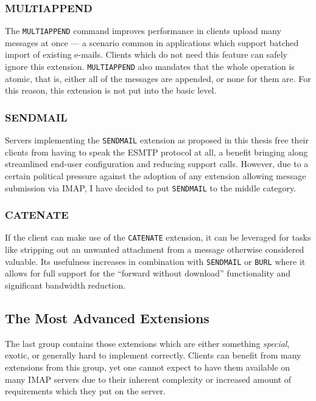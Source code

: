 \documentclass[trojita]{subfiles}
\begin{document}
\subsubsection{MULTIAPPEND}

The {\tt MULTIAPPEND} command improves performance in clients upload many messages at once --- a scenario common in
applications which support batched import of existing e-mails.  Clients which do not need this feature can safely ignore
this extension.  {\tt MULTIAPPEND} also mandates that the whole operation is atomic, that is, either all of the messages
are appended, or none for them are.  For this reason, this extension is not put into the basic level.

\subsubsection{SENDMAIL}

Servers implementing the {\tt SENDMAIL} extension as proposed in this thesis free their clients from having to speak the
ESMTP protocol at all, a benefit bringing along streamlined end-user configuration and reducing support calls.  However,
due to a certain political pressure against the adoption of any extension allowing message submission via IMAP, I have
decided to put {\tt SENDMAIL} to the middle category.

\subsubsection{CATENATE}

If the client can make use of the {\tt CATENATE} extension, it can be leveraged for tasks like stripping out an unwanted
attachment from a message otherwise considered valuable.  Its usefulness increases in combination with {\tt SENDMAIL} or
{\tt BURL} where it allows for full support for the ``forward without download'' functionality and significant bandwidth
reduction.

\subsection{The Most Advanced Extensions}

The last group contains those extensions which are either something {\em special}, exotic, or generally hard to
implement correctly.  Clients can benefit from many extensions from this group, yet one cannot expect to have them
available on many IMAP servers due to their inherent complexity or increased amount of requirements which they put on
the server.
\end{document}
